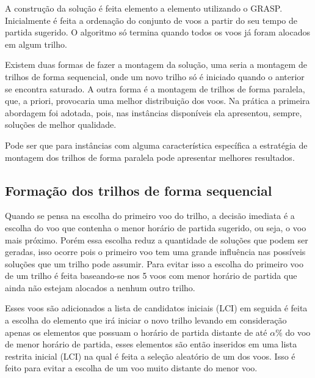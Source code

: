 A construção da solução é feita elemento a elemento utilizando o
GRASP. Inicialmente é feita a ordenação do conjunto de voos a partir do seu
tempo de partida sugerido. O algoritmo só termina quando todos os voos já
foram alocados em algum trilho.
  
Existem duas formas de fazer a montagem da solução, uma seria a montagem de
trilhos de forma sequencial, onde um novo trilho só é iniciado quando o anterior
se encontra saturado. A outra forma é a montagem de trilhos de forma paralela,
que, a priori, provocaria uma melhor distribuição dos voos. Na prática a
primeira abordagem foi adotada, pois, nas instâncias disponíveis ela apresentou,
sempre, soluções de melhor qualidade. 

Pode ser que para instâncias com alguma característica específica a
estratégia de montagem dos trilhos de forma paralela pode apresentar melhores
resultados.


  
\subsection{Formação dos trilhos de forma sequencial}

Quando se pensa na escolha do primeiro voo do trilho, a decisão imediata é a
escolha do voo que contenha o menor horário de partida sugerido, ou seja, o voo
mais próximo. Porém essa escolha reduz a quantidade de soluções que podem ser
geradas, isso ocorre pois o primeiro voo tem uma grande influência nas
possíveis soluções que um trilho pode assumir. Para evitar isso a escolha do
primeiro voo de um trilho é feita baseando-se nos 5 voos com menor horário de
partida que ainda não estejam alocados a nenhum outro trilho. 

Esses voos são adicionados a lista de candidatos iniciais (LCI) em seguida é
feita a escolha do elemento que irá iniciar o novo trilho levando em
consideração apenas os elementos que possuam o horário de partida distante de
até $\alpha \%$ do voo de menor horário de partida, esses elementos são então
inseridos em uma lista restrita inicial (LCI) na qual é feita a seleção
aleatório de um dos voos. Isso é feito para evitar a escolha de um voo muito
distante do menor voo.

